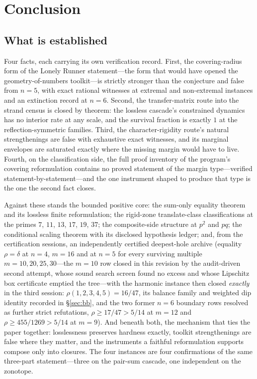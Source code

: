 
\section{Conclusion}\label{sec:concl}

\subsection{What is established}

Four facts, each carrying its own verification record. First, the
covering-radius form of the Lonely Runner statement---the form that
would have opened the geometry-of-numbers toolkit---is strictly stronger
than the conjecture and false from $n=5$, with exact rational witnesses
at extremal and non-extremal instances and an extinction record at
$n=6$. Second, the transfer-matrix route into the strand census is
closed by theorem: the lossless cascade's constrained dynamics has no
interior rate at any scale, and the survival fraction is exactly $1$ at
the reflection-symmetric families. Third, the character-rigidity route's
natural strengthenings are false with exhaustive exact witnesses, and
its marginal envelopes are saturated exactly where the missing margin
would have to live. Fourth, on the classification side, the full proof
inventory of the program's covering reformulation contains no proved
statement of the margin type---verified statement-by-statement---and the
one instrument shaped to produce that type is the one the second fact
closes.

Against these stands the bounded positive core: the sum-only equality
theorem and its lossless finite reformulation; the rigid-zone
translate-class classifications at the primes $7$, $11$, $13$, $17$,
$19$, $37$; the composite-side structure at $p^2$ and $pq$; the
conditional scaling theorem with its disclosed hypothesis ledger; and, from the certification sessions, an independently certified deepest-hole archive
(equality $\rho=\delta$ at $n=4$, $m=16$ and at $n=5$ for every
surviving multiple $m=10,20,25,30$---the $m=10$ row closed in this
revision by the audit-driven second attempt, whose sound search screen
found no excess and whose Lipschitz box certificate emptied the
tree---with the harmonic instance then closed \emph{exactly} in the
third session: $\rho(1,2,3,4,5)=16/47$, its balance family and weighted
dip identity recorded in \S\ref{sec:bb}, and the two former $n=6$
boundary rows resolved as further strict refutations,
$\rho\ge17/47>5/14$ at $m=12$ and $\rho\ge455/1269>5/14$ at $m=9$).
And
beneath both, the mechanism that ties the paper together: losslessness
preserves hardness exactly, toolkit strengthenings are false where they
matter, and the instruments a faithful reformulation supports compose
only into closures. The four instances are four confirmations of the
same three-part statement---three on the pair-sum cascade, one
independent on the zonotope.

